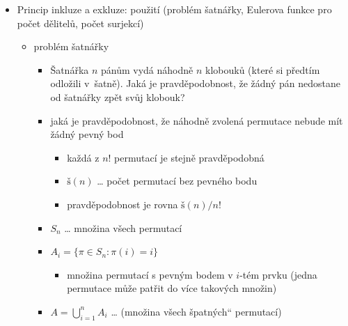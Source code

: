 \begin{itemize}
\begin{itemize}
\begin{itemize}
\begin{itemize}
\item $k \gt t$ \dots{} přispěje $0$
\item $k\leq t$ \dots{} přispěje $(-1)^{k+1}{t\choose k}$
\begin{itemize}
\item vybíráme $k$-tice množin z $t$-množin, do kterých prvek patří
\item minus jednička vychází ze vzorce
\end{itemize}
\item chceme $\sum_{k=1}^t(-1)^{k+1}{t\choose k}=1$
\item lze upravit na $\sum_{k=1}^t(-1)^{k}{t\choose k}=-1$
\item z binomické věty $0=(1-1)^t=\sum_{k=0}^t{t\choose k}(-1)^{k}$
\item tedy bez prvního členu se součet rovná $-1\quad \square$
\end{itemize}
\end{itemize}
\end{itemize}
\item Princip inkluze a exkluze: použití (problém šatnářky, Eulerova funkce pro počet dělitelů, počet surjekcí)
\begin{itemize}
\item problém šatnářky
\begin{itemize}
\item Šatnářka $n$ pánům vydá náhodně $n$ klobouků (které si předtím odložili v~šatně). Jaká je pravděpodobnost, že žádný pán nedostane od šatnářky zpět svůj klobouk?
\item jaká je pravděpodobnost, že náhodně zvolená permutace nebude mít žádný pevný bod
\begin{itemize}
\item každá z $n!$ permutací je stejně pravděpodobná
\item $\text{š}(n)$ \dots{} počet permutací bez pevného bodu
\item pravděpodobnost je rovna $\text{š}(n)/n!$
\end{itemize}
\item $S_n$ \dots{} množina všech permutací
\item $A_i=\lbrace \pi \in S_n : \pi(i)=i\rbrace$
\begin{itemize}
\item množina permutací s pevným bodem v $i$-tém prvku (jedna permutace může patřit do více takových množin)
\end{itemize}
\item $A=\bigcup_{i=1}^n A_i$ \dots{} (množina všech \quotedblbase{}špatných\textquotedblleft{} permutací)

\end{itemize}
\end{itemize}
\end{itemize}
